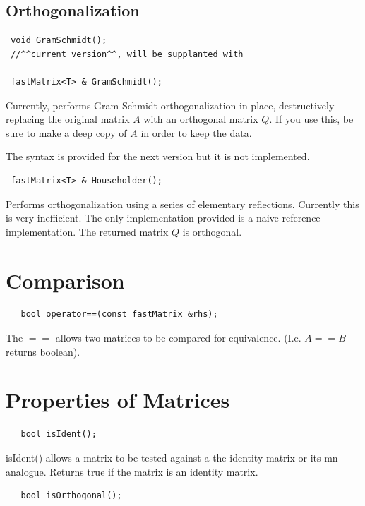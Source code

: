 \documentclass[10pt,fullpage]{article}
\begin{document}
\subsection{Orthogonalization}

\begin{verbatim}
 void GramSchmidt();
 //^^current version^^, will be supplanted with

 fastMatrix<T> & GramSchmidt();
\end{verbatim}

Currently, performs Gram Schmidt orthogonalization in place,
destructively replacing the original matrix $A$ with an orthogonal
matrix $Q$. If you use this, be sure to make a deep copy of $A$ in
order to keep the data.

The syntax is provided for the next version but it is not
implemented.

\begin{verbatim}
 fastMatrix<T> & Householder();
\end{verbatim}

Performs orthogonalization using a series of elementary reflections.
Currently this is very inefficient. The only implementation provided
is a naive reference implementation. The returned matrix $Q$ is
orthogonal.

\newpage

\section{Comparison}

\begin{verbatim}
   bool operator==(const fastMatrix &rhs);
\end{verbatim}

The $==$ allows two matrices to be compared for equivalence. (I.e.
$A == B$ returns boolean).

\section{Properties of Matrices}

\begin{verbatim}
   bool isIdent();
\end{verbatim}

isIdent() allows a matrix to be tested against a the identity matrix
or its mn analogue. Returns true if the matrix is an identity
matrix.

\begin{verbatim}
   bool isOrthogonal();
\end{verbatim}
\end{document}
